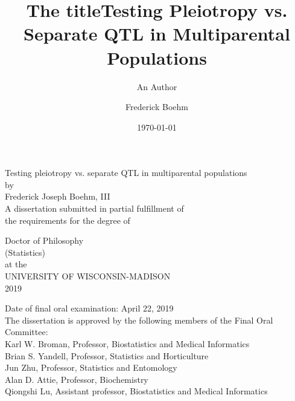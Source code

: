 \documentclass[oneside]{book}\usepackage[]{graphicx}\usepackage[]{color}
\title{The title}
\author{An Author}
\title{Testing Pleiotropy vs. Separate QTL in Multiparental Populations}
\author{Frederick Boehm}
\date{\today}
\begin{document}
\frontmatter %




\doublespacing
\begin{titlepage}\thispagestyle{empty}
\begin{center}
 {\Large%
Testing pleiotropy vs. separate QTL in multiparental populations}\\
 \vspace{1cm}
 by \\
 \vspace{0.5cm}
 {\Large Frederick Joseph Boehm, III}\\[5pt]
 \vspace{1cm}
{A dissertation submitted in partial fulfillment of} \\[5pt]
{the requirements for the degree of}\\
\vspace{1cm}

\Large{{Doctor of Philosophy}}
\\[5pt]
{(Statistics)}\\
at the \\
UNIVERSITY OF WISCONSIN-MADISON\\
2019 \\
\end{center}

\vspace{1.5cm}

Date of final oral examination:  April 22, 2019\\

The dissertation is approved by the following members of the Final Oral Committee:\\
\indent \indent Karl W. Broman, Professor, Biostatistics and Medical Informatics\\
\indent \indent  Brian S. Yandell, Professor, Statistics and Horticulture\\
\indent \indent  Jun Zhu, Professor, Statistics and Entomology\\
\indent \indent Alan D. Attie, Professor, Biochemistry\\
\indent \indent Qiongshi Lu, Assistant professor, Biostatistics and Medical Informatics




 \vfill
\end{titlepage}
\setcounter{page}{1} %
\end{document}
